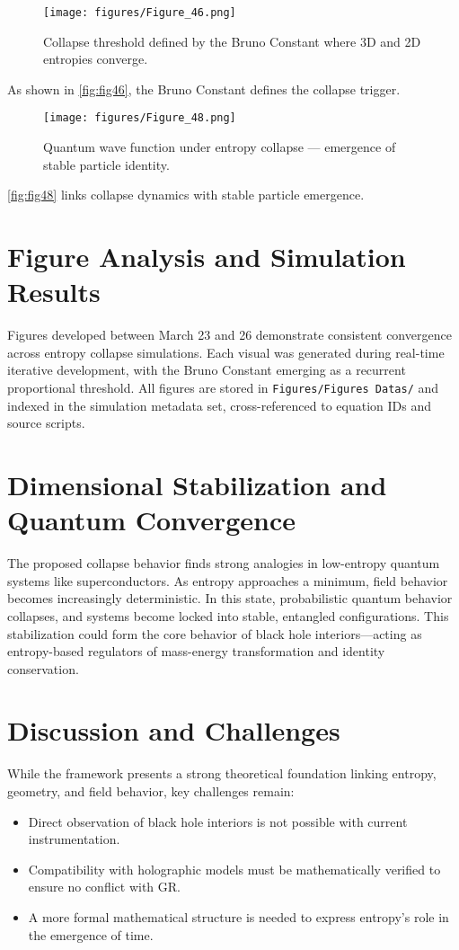 \documentclass[12pt]{article}
\begin{document}
\begin{figure}[H]
    \centering
    \texttt{[image: figures/Figure\_46.png]}
    \caption{Collapse threshold defined by the Bruno Constant where 3D and 2D entropies converge.}
    \label{fig:fig46}
\end{figure}
As shown in \autoref{fig:fig46}, the Bruno Constant defines the collapse trigger.

\begin{figure}[H]
    \centering
    \texttt{[image: figures/Figure\_48.png]}
    \caption{Quantum wave function under entropy collapse — emergence of stable particle identity.}
    \label{fig:fig48}
\end{figure}
\autoref{fig:fig48} links collapse dynamics with stable particle emergence.


\section{Figure Analysis and Simulation Results}
Figures developed between March 23 and 26 demonstrate consistent convergence across entropy collapse simulations. Each visual was generated during real-time iterative development, with the Bruno Constant emerging as a recurrent proportional threshold. All figures are stored in \texttt{Figures/Figures Datas/} and indexed in the simulation metadata set, cross-referenced to equation IDs and source scripts.

\section{Dimensional Stabilization and Quantum Convergence}
The proposed collapse behavior finds strong analogies in low-entropy quantum systems like superconductors. As entropy approaches a minimum, field behavior becomes increasingly deterministic. In this state, probabilistic quantum behavior collapses, and systems become locked into stable, entangled configurations. This stabilization could form the core behavior of black hole interiors—acting as entropy-based regulators of mass-energy transformation and identity conservation.

\section{Discussion and Challenges}
While the framework presents a strong theoretical foundation linking entropy, geometry, and field behavior, key challenges remain:
\begin{itemize}
    \item Direct observation of black hole interiors is not possible with current instrumentation.
    \item Compatibility with holographic models must be mathematically verified to ensure no conflict with GR.
    \item A more formal mathematical structure is needed to express entropy's role in the emergence of time.
\end{itemize}
\end{document}
